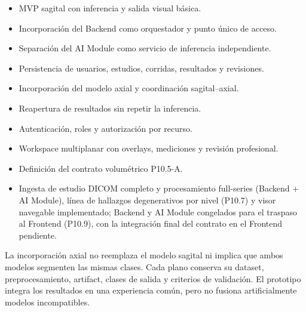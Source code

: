\begin{itemize}
  \item MVP sagital con inferencia y salida visual básica.
  \item Incorporación del Backend como orquestador y punto único de acceso.
  \item Separación del AI Module como servicio de inferencia independiente.
  \item Persistencia de usuarios, estudios, corridas, resultados y revisiones.
  \item Incorporación del modelo axial y coordinación sagital–axial.
  \item Reapertura de resultados sin repetir la inferencia.
  \item Autenticación, roles y autorización por recurso.
  \item Workspace multiplanar con overlays, mediciones y revisión profesional.
  \item Definición del contrato volumétrico P10.5-A.
  \item Ingesta de estudio DICOM completo y procesamiento full-series (Backend + AI Module), línea de hallazgos degenerativos por nivel (P10.7) y visor navegable implementado; Backend y AI Module congelados para el traspaso al Frontend (P10.9), con la integración final del contrato en el Frontend pendiente.
\end{itemize}

La incorporación axial no reemplaza el modelo sagital ni implica que ambos modelos segmenten las mismas clases. Cada plano conserva su dataset, preprocesamiento, artifact, clases de salida y criterios de validación. El prototipo integra los resultados en una experiencia común, pero no fusiona artificialmente modelos incompatibles.

